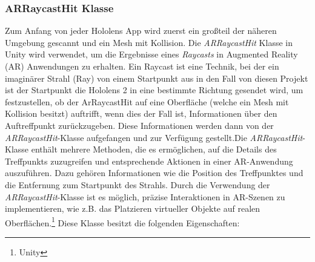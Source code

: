 \subsubsection{\label{sec:ARRaycastHit}ARRaycastHit Klasse}
Zum Anfang von jeder Hololens App wird zuerst ein großteil der näheren Umgebung gescannt und ein Mesh mit Kollision.
Die \textit{ARRaycastHit} Klasse in Unity wird verwendet, um die Ergebnisse eines \textit{Raycasts} in Augmented Reality
(AR) Anwendungen zu erhalten.
Ein Raycast ist eine Technik, bei der ein imaginärer Strahl (Ray) von einem Startpunkt aus
in den Fall von diesen Projekt ist der Startpunkt die Hololens 2 in eine bestimmte Richtung gesendet wird, um festzustellen, ob
der ArRaycastHit auf eine Oberfläche (welche ein Mesh mit Kollision besitzt) auftrifft, wenn dies der Fall ist,
Informationen über den Auftreffpunkt zurückzugeben. Diese Informationen werden dann von der \textit{ARRaycastHit}-Klasse
aufgefangen und zur Verfügung gestellt.Die \textit{ARRaycastHit}-Klasse enthält mehrere Methoden, die es ermöglichen, auf
die Details des Treffpunkts zuzugreifen und entsprechende Aktionen in einer AR-Anwendung auszuführen. Dazu gehören Informationen
wie die Position des Treffpunktes und die Entfernung zum Startpunkt des Strahls. Durch die Verwendung der \textit{ARRaycastHit}-Klasse
ist es möglich, präzise Interaktionen in AR-Szenen zu implementieren, wie z.B. das Platzieren virtueller Objekte auf
realen Oberflächen.\protect\footnote{Unity\cite{ARRaycastHit}} Diese Klasse besitzt die folgenden Eigenschaften:
